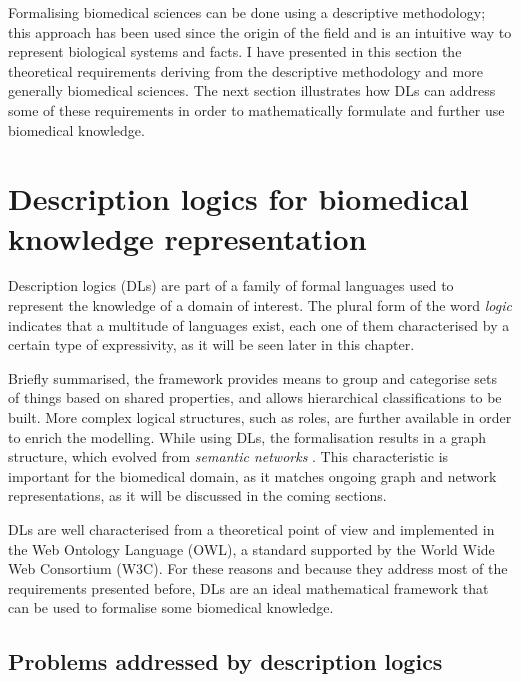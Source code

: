 Formalising biomedical sciences can be done using a descriptive methodology; this approach has been used since the origin of the field and is an intuitive way to represent biological systems and facts. I have presented in this section the theoretical requirements deriving from the descriptive methodology and more generally biomedical sciences. The next section illustrates how DLs can address some of these requirements in order to mathematically formulate and further use biomedical knowledge.

\section{Description logics for biomedical knowledge representation}

Description logics (DLs) are part of a family of formal languages used to represent the knowledge of a domain of interest. The plural form of the word \emph{logic} indicates that a multitude of languages exist, each one of them characterised by a certain type of expressivity, as it will be seen later in this chapter.

Briefly summarised, the framework provides means to group and categorise sets of things based on shared properties, and allows hierarchical classifications to be built. More complex logical structures, such as roles, are further available in order to enrich the modelling. While using DLs, the formalisation results in a graph structure, which evolved from \emph{semantic networks} \citep{allen1982s}. This characteristic is important for the biomedical domain, as it matches ongoing graph and network representations, as it will be discussed in the coming sections.

DLs are well characterised from a theoretical point of view and implemented in the Web Ontology Language (OWL), a standard supported by the World Wide Web Consortium (W3C). For these reasons and because they address most of the requirements presented before, DLs are an ideal mathematical framework that can be used to formalise some biomedical knowledge.

\subsection{Problems addressed by description logics}

